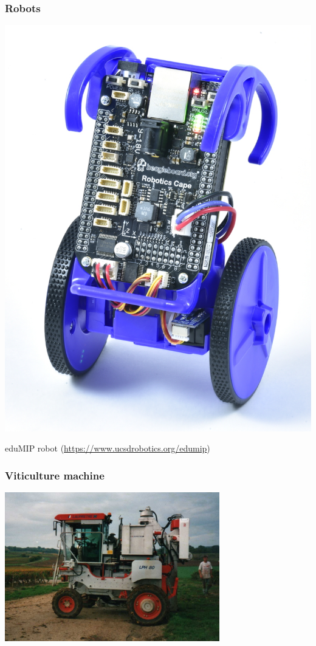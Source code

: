 \begin{frame}
\frametitle{Robots}
  \begin{center}
    \includegraphics[height=0.75\textheight]{slides/sysdev-intro/beagle-robot.jpg}
  \end{center}
  eduMIP robot (\url{https://www.ucsdrobotics.org/edumip})
\end{frame}

\begin{frame}
\frametitle{Viticulture machine}
  \begin{center}
    \includegraphics[width=0.7\textwidth]{slides/sysdev-intro/viticulture-machine.jpg}
  \end{center}
\end{frame}

